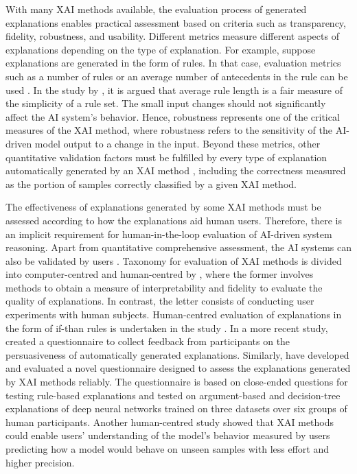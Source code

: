 With many XAI methods available, the evaluation process of generated explanations enables practical assessment based on criteria such as transparency, fidelity, robustness, and usability. Different metrics measure different aspects of explanations depending on the type of explanation. For example, suppose explanations are generated in the form of rules. In that case, evaluation metrics such as a number of rules or an average number of antecedents in the rule can be used \citep{giulia_2020}. In the study by \citet{ribeiro2016}, it is argued that average rule length is a fair measure of the simplicity of a rule set. The small input changes should not significantly affect the AI system's behavior. Hence, robustness represents one of the critical measures of the XAI method, where robustness refers to the sensitivity of the AI-driven model output to a change in the input. Beyond these metrics, other quantitative validation factors must be fulfilled by every type of explanation automatically generated by an XAI method \citep{giulia_2021}, including the correctness measured as the portion of samples correctly classified by a given XAI method. 

The effectiveness of explanations generated by some XAI methods must be assessed according to how the explanations aid human users. Therefore, there is an implicit requirement for human-in-the-loop evaluation of AI-driven system reasoning.
Apart from quantitative comprehensive assessment, the AI systems can also be validated by users \citep{ali}. Taxonomy for evaluation of XAI methods is divided into computer-centred and human-centred by \citet{Lopes_2022}, where the former involves methods to obtain a measure of interpretability and fidelity to evaluate the quality of explanations. In contrast, the letter consists of conducting user experiments with human subjects. Human-centred evaluation of explanations in the form of if-than rules is undertaken in the study \citep{Huysmans_2011}. In a more recent study, \citet{dragoni_2020} created a questionnaire to collect feedback from participants on the persuasiveness of automatically generated explanations. Similarly, \citet{giulia_test} have developed and evaluated a novel questionnaire designed to assess the explanations generated by XAI methods reliably. The questionnaire is based on close-ended questions for testing rule-based explanations and tested on argument-based and decision-tree explanations of deep neural networks trained on three datasets over six groups of human participants. Another human-centred study \citep{Anchors} showed that XAI methods could enable users' understanding of the model’s behavior measured by users predicting how a model would behave on unseen samples with less effort and higher precision.

